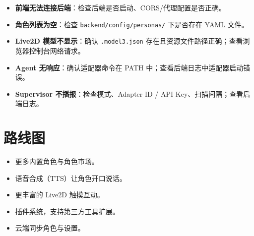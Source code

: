 \documentclass[12pt,a4paper]{article}
\begin{document}
\begin{itemize}[leftmargin=2em]
  \item \textbf{前端无法连接后端}：检查后端是否启动、CORS/代理配置是否正确。
  \item \textbf{角色列表为空}：检查 \texttt{backend/config/personas/} 下是否存在 YAML 文件。
  \item \textbf{Live2D 模型不显示}：确认 \texttt{.model3.json} 存在且资源文件路径正确；查看浏览器控制台网络请求。
  \item \textbf{Agent 无响应}：确认适配器命令在 PATH 中；查看后端日志中适配器启动错误。
  \item \textbf{Supervisor 不播报}：检查模式、Adapter ID / API Key、扫描间隔；查看后端日志。
\end{itemize}

\section{路线图}

\begin{itemize}[leftmargin=2em]
  \item 更多内置角色与角色市场。
  \item 语音合成（TTS）让角色开口说话。
  \item 更丰富的 Live2D 触摸互动。
  \item 插件系统，支持第三方工具扩展。
  \item 云端同步角色与设置。
\end{itemize}
\end{document}
